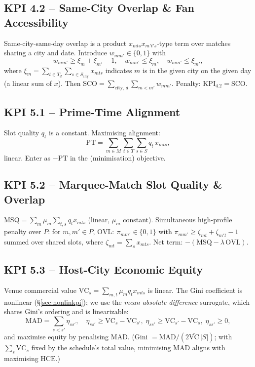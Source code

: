 \documentclass[12pt, letterpaper]{article}
\begin{document}
\subsection{KPI 4.2 -- Same-City Overlap \& Fan Accessibility}
Same-city-same-day overlap is a product $x_{mts}x_{m't's}$-type term over
matches sharing a city and date. Introduce $w_{mm'}\in\{0,1\}$ with
\begin{equation}
w_{mm'}\ge \xi_{m}+\xi_{m'}-1,\quad w_{mm'}\le \xi_m,\quad w_{mm'}\le
\xi_{m'},
\end{equation}
where $\xi_m=\sum_{t\in T_d}\sum_{s\in S_{\text{city}}} x_{mts}$ indicates
$m$ is in the given city on the given day (a linear sum of $x$). Then
$\mathrm{SCO}=\sum_{\text{city},\,d}\sum_{m<m'} w_{mm'}$. Penalty:
$\mathrm{KPI}_{4.2}=\mathrm{SCO}$.

\subsection{KPI 5.1 -- Prime-Time Alignment}
Slot quality $q_t$ is a constant. Maximising alignment:
\begin{equation}
\mathrm{PT}=\sum_{m\in M}\sum_{t\in T}\sum_{s\in S} q_t\, x_{mts},
\end{equation}
linear. Enter as $-\mathrm{PT}$ in the (minimisation) objective.

\subsection{KPI 5.2 -- Marquee-Match Slot Quality \& Overlap}
$\mathrm{MSQ}=\sum_{m}\mu_m\sum_{t,s} q_t x_{mts}$ (linear, $\mu_m$
constant). Simultaneous high-profile penalty over $P$: for
$m,m'\in P$, $\mathrm{OVL}\!:\ \pi_{mm'}\in\{0,1\}$ with
$\pi_{mm'}\ge \zeta_{mt}+\zeta_{m't}-1$ summed over shared slots, where
$\zeta_{mt}=\sum_s x_{mts}$. Net term: $-(\mathrm{MSQ}-\lambda\,
\mathrm{OVL})$.

\subsection{KPI 5.3 -- Host-City Economic Equity}
Venue commercial value $\mathrm{VC}_s=\sum_{m,t}\mu_m q_t x_{mts}$ is
linear. The Gini coefficient is nonlinear (\S\ref{sec:nonlinkpi}); we use
the \emph{mean absolute difference} surrogate, which shares Gini's
ordering and is linearizable:
\begin{equation}
\mathrm{MAD}=\sum_{s<s'} \eta_{ss'},\quad
\eta_{ss'}\ge \mathrm{VC}_s-\mathrm{VC}_{s'},\;
\eta_{ss'}\ge \mathrm{VC}_{s'}-\mathrm{VC}_s,\;\eta_{ss'}\ge0,
\end{equation}
and maximise equity by penalising $\mathrm{MAD}$. (Gini $=
\mathrm{MAD}/(2\bar{\mathrm{VC}}\,|S|)$; with $\sum_s\mathrm{VC}_s$ fixed
by the schedule's total value, minimising MAD aligns with maximising
$\mathrm{HCE}$.)
\end{document}
